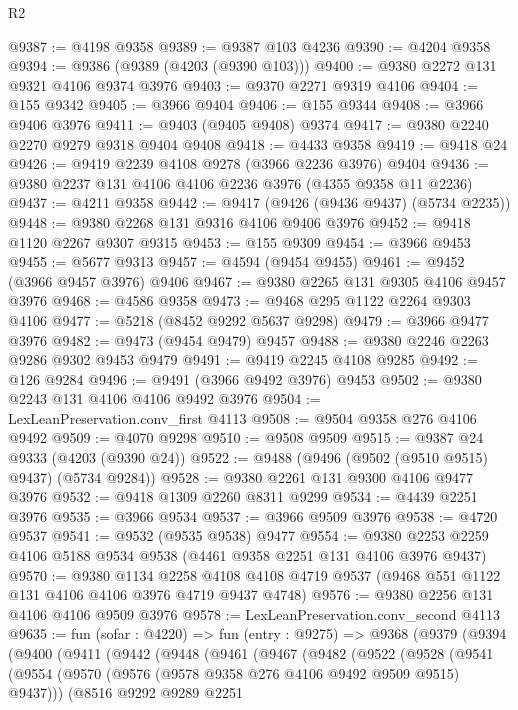 \begin{lexlean}{R2}
\begin{coremodule}
@9387 := @4198 @9358
@9389 := @9387 @103 @4236
@9390 := @4204 @9358
@9394 := @9386 (@9389 (@4203 (@9390 @103)))
@9400 := @9380 @2272 @131 @9321 @4106 @9374 @3976
@9403 := @9370 @2271 @9319 @4106
@9404 := @155 @9342
@9405 := @3966 @9404
@9406 := @155 @9344
@9408 := @3966 @9406 @3976
@9411 := @9403 (@9405 @9408) @9374
@9417 := @9380 @2240 @2270 @9279 @9318 @9404 @9408
@9418 := @4433 @9358
@9419 := @9418 @24
@9426 := @9419 @2239 @4108 @9278 (@3966 @2236 @3976) @9404
@9436 := @9380 @2237 @131 @4106 @4106 @2236 @3976 (@4355 @9358 @11 @2236)
@9437 := @4211 @9358
@9442 := @9417 (@9426 (@9436 @9437) (@5734 @2235))
@9448 := @9380 @2268 @131 @9316 @4106 @9406 @3976
@9452 := @9418 @1120 @2267 @9307 @9315
@9453 := @155 @9309
@9454 := @3966 @9453
@9455 := @5677 @9313
@9457 := @4594 (@9454 @9455)
@9461 := @9452 (@3966 @9457 @3976) @9406
@9467 := @9380 @2265 @131 @9305 @4106 @9457 @3976
@9468 := @4586 @9358
@9473 := @9468 @295 @1122 @2264 @9303 @4106
@9477 := @5218 (@8452 @9292 @5637 @9298)
@9479 := @3966 @9477 @3976
@9482 := @9473 (@9454 @9479) @9457
@9488 := @9380 @2246 @2263 @9286 @9302 @9453 @9479
@9491 := @9419 @2245 @4108 @9285
@9492 := @126 @9284
@9496 := @9491 (@3966 @9492 @3976) @9453
@9502 := @9380 @2243 @131 @4106 @4106 @9492 @3976
@9504 := LexLeanPreservation.conv_first @4113
@9508 := @9504 @9358 @276 @4106 @9492
@9509 := @4070 @9298
@9510 := @9508 @9509
@9515 := @9387 @24 @9333 (@4203 (@9390 @24))
@9522 := @9488 (@9496 (@9502 (@9510 @9515) @9437) (@5734 @9284))
@9528 := @9380 @2261 @131 @9300 @4106 @9477 @3976
@9532 := @9418 @1309 @2260 @8311 @9299
@9534 := @4439 @2251 @3976
@9535 := @3966 @9534
@9537 := @3966 @9509 @3976
@9538 := @4720 @9537
@9541 := @9532 (@9535 @9538) @9477
@9554 := @9380 @2253 @2259 @4106 @5188 @9534 @9538 (@4461 @9358 @2251 @131 @4106 @3976 @9437)
@9570 := @9380
    @1134
    @2258
    @4108
    @4108
    @4719
    @9537
    (@9468 @551 @1122 @131 @4106 @4106 @3976 @4719 @9437 @4748)
@9576 := @9380 @2256 @131 @4106 @4106 @9509 @3976
@9578 := LexLeanPreservation.conv_second @4113
@9635 := fun (sofar : @4220) =>
  fun (entry : @9275) =>
  @9368
    (@9379
      (@9394
        (@9400
          (@9411
            (@9442
              (@9448
                (@9461
                  (@9467
                    (@9482
                      (@9522
                        (@9528
                          (@9541
                            (@9554 (@9570 (@9576 (@9578 @9358 @276 @4106 @9492 @9509 @9515) @9437)))
                            (@8516
                              @9292
                              @9289
                              @2251

\end{coremodule}
\end{lexlean}

